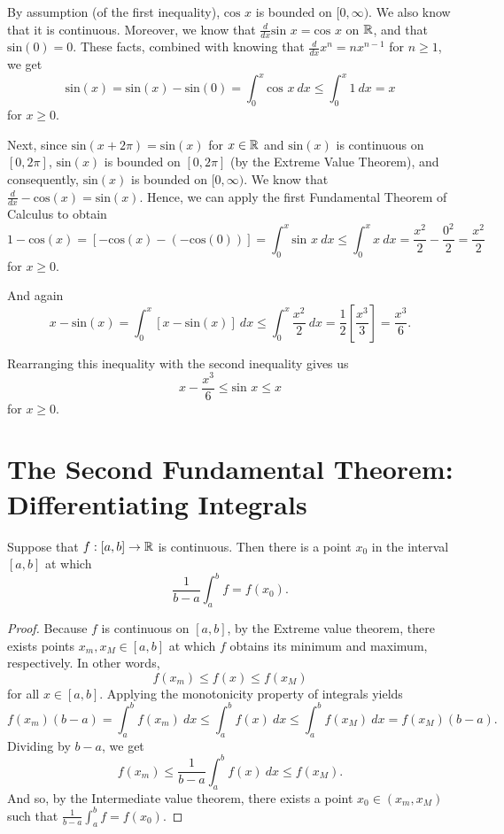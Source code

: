 \documentclass[letterpaper, twoside, 12pt]{book}
\begin{document}
\begin{solution}
    By assumption (of the first inequality), \(\text{cos~}x\) is bounded
    on \([0, \infty)\). We also know that it is continuous. Moreover,
    we know that \(\frac{d}{dx} \text{sin~} x = \text{cos~} x\) on \(\mathbb R\), and
    that \(\text{sin}(0) = 0\). These facts, combined with knowing that
    \(\frac{d}{dx} x^n = nx^{n-1}\) for \(n \geq 1\), we get
    \[ \text{sin}(x) = \text{sin}(x) - \text{sin}(0) = 
            \int_0^x \text{cos~} x ~dx \leq  \int_0^x 1 ~dx = x \]
    for \(x \geq 0\). 

    Next, since \(\text{sin}(x + 2\pi) = \text{sin}(x)\) for \(x \in \mathbb R\) and
    \(\text{sin}(x)\) is continuous on \([0, 2\pi]\), \(\text{sin}(x)\) is 
    bounded on \([0, 2\pi]\) (by the Extreme Value Theorem), and consequently,
    \(\text{sin}(x)\) is bounded on \([0, \infty)\). We know that
    \(\frac{d}{dx} -\text{cos}(x) = \text{sin}(x) \). Hence, we can apply the
    first Fundamental Theorem of Calculus to obtain
    \[ 1 - \text{cos}(x) = [ -\text{cos}(x) - (-\text{cos}(0)) ] 
        = \int_0^x \text{sin~} x ~dx \leq \int_0^x x ~dx 
    = \frac{x^2}{2} - \frac{0^2}{2} = \frac{x^2}{2} \]
    for \(x \geq 0\).

    And again
    \[ x - \text{sin}(x) = \int_0^x [x - \text{sin}(x) ] ~ dx \leq \int_0^x \frac{x^2}{2} ~ dx = \frac{1}{2}[\frac{x^3}{3}] = \frac{x^3}{6}. \]

    Rearranging this inequality with the second inequality gives us
    \[ x - \frac{x^3}{6} \leq \text{sin~} x \leq x \]
    for \(x \geq 0\).
\end{solution}


\section{The Second Fundamental Theorem: Differentiating Integrals}


\begin{theorem}
  Suppose that \(f:[a,b]\to\mathbb R\) is continuous. Then there is a point \(x_0\)
  in the interval \([a,b]\) at which
  \[
    \frac{1}{b-a}\int_a^b f
      =
    f(x_0)
  .\]
\end{theorem}

\begin{proof}
    Because \(f\) is continuous on \([a,b]\), by the Extreme value theorem, 
    there exists points \(x_m, x_M \in [a,b]\) at which \(f\) obtains its 
    minimum and maximum, respectively. In other words,
    \[ f(x_m) \leq f(x) \leq f(x_M) \]
    for all \(x \in [a,b]\). Applying the monotonicity property of integrals yields
    \[ f(x_m)(b - a) = \int_a^b f(x_m) ~dx \leq \int_a^b f(x) ~dx \leq \int_a^b f(x_M) ~dx = f(x_M)(b - a) .\]
    Dividing by \(b - a\), we get
    \[ f(x_m) \leq \frac{1}{b - a} \int_a^b f(x) ~dx \leq f(x_M) .\]
    And so, by the Intermediate value theorem, there exists a point \(x_0 \in (x_m, x_M)\)
    such that \(\frac{1}{b-a} \int_a^b f = f(x_0) \).
\end{proof}
\end{document}
